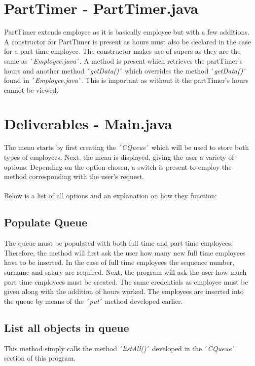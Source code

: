 \documentclass[12pt]{article}
\begin{document}
\section{PartTimer - PartTimer.java}
PartTimer extends employee as it is basically employee but with a few additions. A constructor for PartTimer is present as hours must also be declared in the case for a part time employee. The constructor makes use of supers as they are the same as ´\emph{Employee.java}´. A method is present which retrieves the partTimer's hours and another method ´\emph{getData()}´ which overrides the method ´\emph{getData()}´ found in ´\emph{Employee.java}´. This is important as without it the partTimer's hours cannot be viewed.
\bigskip

\section{Deliverables - Main.java}
The menu starts by first creating the ´\emph{CQueue}´ which will be used to store both types of employees. Next, the menu is displayed, giving the user a variety of options. Depending on the option chosen, a switch is present to employ the method corresponding with the user's request.\\
\\Below is a list of all options and an explanation on how they function:

\subsection{Populate Queue}
The queue must be populated with both full time and part time employees. Therefore, the method will first ask the user how many new full time employees have to be inserted. In the case of full time employees the sequence number, surname and salary are required. Next, the program will ask the user how much part time employees must be created. The same credentials as employee must be given along with the addition of hours worked. The employees are inserted into the queue by means of the ´\emph{put}´ method developed earlier.

\subsection{List all objects in queue}
This method simply calls the method ´\emph{listAll()}´ developed in the ´\emph{CQueue}´ section of this program.
\end{document}
